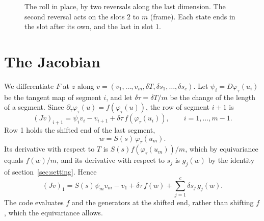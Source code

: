 \documentclass[11pt,a4paper]{article}
\newcommand{\roll}{\mathcal{R}}
\begin{document}
\begin{figure}
  \centering
  \caption{The roll in place, by two reversals along the last dimension. The second reversal acts
  on the slots $2$ to $m$ (frame). Each state ends in the slot after its own, and the last in slot
  1.}
  \label{fig:roll}
\end{figure}

\section{The Jacobian}
\label{sec:jacobian}

We differentiate $F$ at $z$ along $v = (v_1, \dots, v_m, \delta T, \delta s_1, \dots, \delta
s_c)$. Let $\psi_i = D\varphi_\tau(u_i)$ be the tangent map of segment $i$, and let $\delta\tau =
\delta T / m$ be the change of the length of a segment. Since $\partial_\tau \varphi_\tau(u) =
f(\varphi_\tau(u))$, the row of segment $i + 1$ is
\begin{equation}
  (Jv)_{i+1} = \psi_i v_i - v_{i+1} + \delta\tau\, f(\varphi_\tau(u_i)), \qquad i = 1, \dots, m-1 .
\end{equation}
Row 1 holds the shifted end of the last segment,
\begin{equation}
  w = S(s)\,\varphi_\tau(u_m) .
\end{equation}
Its derivative with respect to $T$ is $S(s) f(\varphi_\tau(u_m))/m$, which by equivariance equals
$f(w)/m$, and its derivative with respect to $s_j$ is $g_j(w)$ by the identity of
section~\ref{sec:setting}. Hence
\begin{equation}
  (Jv)_1 = S(s)\psi_m v_m - v_1 + \delta\tau\, f(w) + \sum_{j=1}^c \delta s_j\, g_j(w).
\end{equation}
The code evaluates $f$ and the generators at the shifted end, rather than shifting $f$, which the
equivariance allows.
\end{document}
